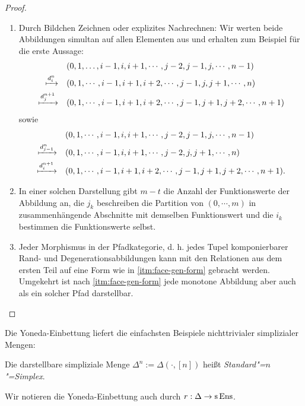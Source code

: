 \begin{proof}
  \begin{enumerate}[label=(\roman*)]
  \item Durch Bildchen Zeichnen oder explizites Nachrechnen: Wir
    werten beide Abbildungen simultan auf allen Elementen aus und
    erhalten zum Beispiel für die erste Aussage:
  \begin{align*}
  &(0, 1, \dots, i-1, i, i+1, \cdots, j-2, j-1, j, \cdots, n-1) \\
  \xmapsto{d_i^n} \quad
  &(0, 1, \cdots, i-1, i+1, i+2, \cdots, j-1, j, j+1, \cdots, n) \\
  \xmapsto{d_j^{n+1}} \quad
  &(0, 1, \cdots, i-1, i+1, i+2, \cdots, j-1, j+1, j+2, \cdots, n+1)
  \end{align*}
  sowie
  \begin{align*}
  &(0, 1, \cdots, i-1, i, i+1, \cdots, j-2, j-1, j, \cdots, n-1) \\
  \xmapsto{d_{j-1}^n} \quad
  &(0, 1, \cdots, i-1, i, i+1, \cdots, j-2, j, j+1, \cdots, n) \\
  \xmapsto{d_i^{n+1}} \quad
  &(0, 1, \cdots, i-1, i+1, i+2, \cdots, j-1, j+1, j+2, \cdots, n+1).
  \end{align*}

  \item In einer solchen Darstellung gibt $m - t$ die Anzahl der
  Funktionswerte der Abbildung an, die $j_k$ beschreiben die Partition
  von $(0, \cdots, m)$ in zusammenhängende Abschnitte mit demselben
  Funktionswert und die $i_k$ bestimmen die Funktionswerte selbst.

  \item Jeder Morphismus in der Pfadkategorie, d. h. jedes Tupel
    komponierbarer Rand- und Degenerationsabbildungen kann mit den
    Relationen aus dem ersten Teil auf eine Form wie in
    \ref{itm:face-gen-form} gebracht werden. Umgekehrt ist nach
    \ref{itm:face-gen-form} jede monotone Abbildung aber auch als ein
    solcher Pfad darstellbar.
\end{enumerate}
\end{proof}

Die Yoneda-Einbettung liefert die einfachsten Beispiele nichttrivialer
simplizialer Mengen:
\begin{defn} \label{def:comb-standard-simplex}
  Die darstellbare simpliziale Menge $\Delta^n := \Delta(\cdot, [n])$
  heißt \emph{Standard"=$n$"=Simplex}.
\end{defn}
Wir notieren die Yoneda-Einbettung auch durch $r: \Delta \to \operatorname{s}\operatorname{Ens}$.


